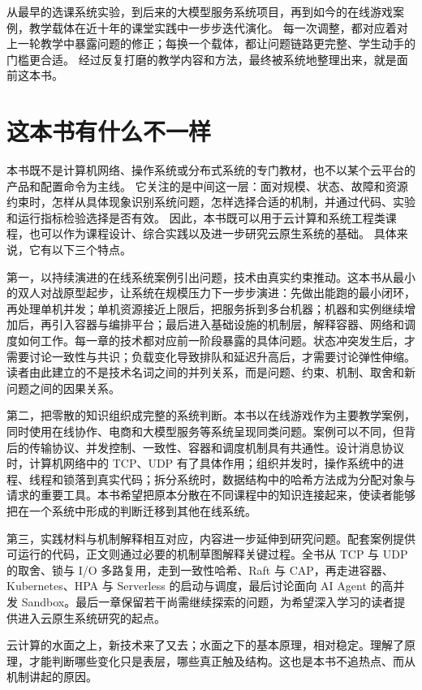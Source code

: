 从最早的选课系统实验，到后来的大模型服务系统项目，再到如今的在线游戏案例，教学载体在近十年的课堂实践中一步步迭代演化。
每一次调整，都对应着对上一轮教学中暴露问题的修正；每换一个载体，都让问题链路更完整、学生动手的门槛更合适。
经过反复打磨的教学内容和方法，最终被系统地整理出来，就是面前这本书。

\section*{这本书有什么不一样}

本书既不是计算机网络、操作系统或分布式系统的专门教材，也不以某个云平台的产品和配置命令为主线。
它关注的是中间这一层：面对规模、状态、故障和资源约束时，怎样从具体现象识别系统问题，怎样选择合适的机制，并通过代码、实验和运行指标检验选择是否有效。
因此，本书既可以用于云计算和系统工程类课程，也可以作为课程设计、综合实践以及进一步研究云原生系统的基础。
具体来说，它有以下三个特点。

第一，以持续演进的在线系统案例引出问题，技术由真实约束推动。这本书从最小的双人对战原型起步，让系统在规模压力下一步步演进：先做出能跑的最小闭环，再处理单机并发；单机资源接近上限后，把服务拆到多台机器；机器和实例继续增加后，再引入容器与编排平台；最后进入基础设施的机制层，解释容器、网络和调度如何工作。每一章的技术都对应前一阶段暴露的具体问题。状态冲突发生后，才需要讨论一致性与共识；负载变化导致排队和延迟升高后，才需要讨论弹性伸缩。读者由此建立的不是技术名词之间的并列关系，而是问题、约束、机制、取舍和新问题之间的因果关系。

第二，把零散的知识组织成完整的系统判断。本书以在线游戏作为主要教学案例，同时使用在线协作、电商和大模型服务等系统呈现同类问题。案例可以不同，但背后的传输协议、并发控制、一致性、容器和调度机制具有共通性。设计消息协议时，计算机网络中的 TCP、UDP 有了具体作用；组织并发时，操作系统中的进程、线程和锁落到真实代码；拆分系统时，数据结构中的哈希方法成为分配对象与请求的重要工具。本书希望把原本分散在不同课程中的知识连接起来，使读者能够把在一个系统中形成的判断迁移到其他在线系统。

第三，实践材料与机制解释相互对应，内容进一步延伸到研究问题。配套案例提供可运行的代码，正文则通过必要的机制草图解释关键过程。全书从 TCP 与 UDP 的取舍、锁与 I/O 多路复用，走到一致性哈希、Raft 与 CAP，再走进容器、Kubernetes、HPA 与 Serverless 的启动与调度，最后讨论面向 AI Agent 的高并发 Sandbox。最后一章保留若干尚需继续探索的问题，为希望深入学习的读者提供进入云原生系统研究的起点。

云计算的水面之上，新技术来了又去；水面之下的基本原理，相对稳定。理解了原理，才能判断哪些变化只是表层，哪些真正触及结构。这也是本书不追热点、而从机制讲起的原因。

